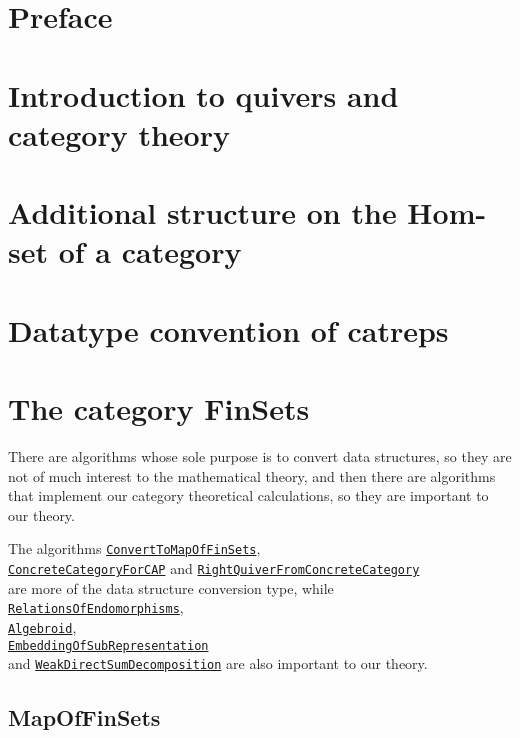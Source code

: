 \documentclass{article}
\begin{document}
\tableofcontents\label{toc}
\section{Preface}

\section{Introduction to quivers and category theory}


\section{Additional structure on the Hom-set of a category}


\section{Datatype convention of catreps}


\section{The category FinSets}

There are algorithms whose sole purpose is to convert data structures, so they are not of much interest to the mathematical theory,
and then there are algorithms that implement our category theoretical calculations, so they are important to our theory.

The algorithms \hyperref[func:ConvertToMapOfFinSets]{\texttt{ConvertToMapOfFinSets}},\\
\hyperref[func:ConcreteCategoryForCAP]{\texttt{ConcreteCategoryForCAP}} and
\hyperref[func:RightQuiverFromConcreteCategory]{\texttt{RightQuiverFromConcreteCategory}}\\
are more of the data structure conversion type, while 
\hyperref[func:RelationsOfEndomorphisms]{\texttt{RelationsOfEndomorphisms}},\\
\hyperref[func:Algebroid]{\texttt{Algebroid}},\\
\hyperref[func:EmbeddingOfSubRepresentation]{\texttt{EmbeddingOfSubRepresentation}}\\
and \hyperref[func:WeakDirectSumDecomposition]{\texttt{WeakDirectSumDecomposition}} are also important to our theory.

\subsection{MapOfFinSets}
\end{document}
